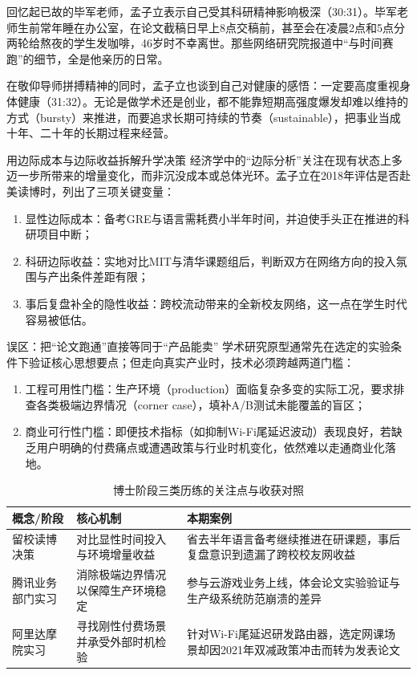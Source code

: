 \documentclass[UTF8,a4paper,11pt,fontset=fandol]{ctexart}
\begin{document}
回忆起已故的毕军老师，孟子立表示自己受其科研精神影响极深（30:31）。毕军老师生前常年睡在办公室，在论文截稿日早上8点交稿前，甚至会在凌晨2点和5点分两轮给熬夜的学生发咖啡，46岁时不幸离世。那些网络研究院报道中“与时间赛跑”的细节，全是他亲历的日常。

在敬仰导师拼搏精神的同时，孟子立也谈到自己对健康的感悟：一定要高度重视身体健康（31:32）。无论是做学术还是创业，都不能靠短期高强度爆发却难以维持的方式（bursty）来推进，而要追求长期可持续的节奏（sustainable），把事业当成十年、二十年的长期过程来经营。

\begin{knowledgebox}{用边际成本与边际收益拆解升学决策}
经济学中的“边际分析”关注在现有状态上多迈一步所带来的增量变化，而非沉没成本或总体光环。孟子立在2018年评估是否赴美读博时，列出了三项关键变量：
\begin{enumerate}
\item 显性边际成本：备考GRE与语言需耗费小半年时间，并迫使手头正在推进的科研项目中断；
\item 科研边际收益：实地对比MIT与清华课题组后，判断双方在网络方向的投入氛围与产出条件差距有限；
\item 事后复盘补全的隐性收益：跨校流动带来的全新校友网络，这一点在学生时代容易被低估。
\end{enumerate}
\end{knowledgebox}
\begin{warningbox}{误区：把“论文跑通”直接等同于“产品能卖”}
学术研究原型通常先在选定的实验条件下验证核心思想要点；但走向真实产业时，技术必须跨越两道门槛：
\begin{enumerate}
\item 工程可用性门槛：生产环境（production）面临复杂多变的实际工况，要求排查各类极端边界情况（corner case），填补A/B测试未能覆盖的盲区；
\item 商业可行性门槛：即便技术指标（如抑制Wi-Fi尾延迟波动）表现良好，若缺乏用户明确的付费痛点或遭遇政策与行业时机变化，依然难以走通商业化落地。
\end{enumerate}
\end{warningbox}
\begin{table}[H]\centering\small
\caption{博士阶段三类历练的关注点与收获对照}
\begin{tabular}{>{\raggedright\arraybackslash}p{\dimexpr(\linewidth-6\tabcolsep)/3\relax}>{\raggedright\arraybackslash}p{\dimexpr(\linewidth-6\tabcolsep)/3\relax}>{\raggedright\arraybackslash}p{\dimexpr(\linewidth-6\tabcolsep)/3\relax}}
\toprule
概念/阶段 & 核心机制 & 本期案例\\\midrule
留校读博决策 & 对比显性时间投入与环境增量收益 & 省去半年语言备考继续推进在研课题，事后复盘意识到遗漏了跨校校友网收益\\[4pt]
腾讯业务部门实习 & 消除极端边界情况以保障生产环境稳定 & 参与云游戏业务上线，体会论文实验验证与生产级系统防范崩溃的差异\\[4pt]
阿里达摩院实习 & 寻找刚性付费场景并承受外部时机检验 & 针对Wi-Fi尾延迟研发路由器，选定网课场景却因2021年双减政策冲击而转为发表论文\\[4pt]
\bottomrule\end{tabular}\end{table}
\end{document}
